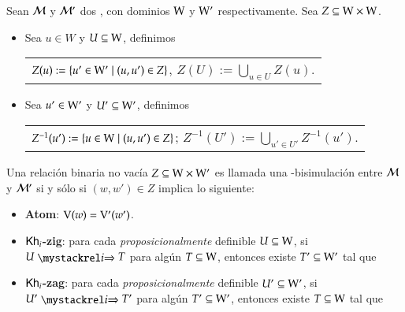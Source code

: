 \begin{definicion}\label{def:bisimulation}
    Sean $\mathcal{M}$ y $\mathcal{M}'$ dos \ultss, con dominios $\mathrm{W}$ y $\mathrm{W}'$ respectivamente. Sea $Z \subseteq \mathrm{W} \times \mathrm{W}$.
    \begin{itemize}
        \item Sea $u \in W$ y $U \subseteq \mathrm{W}$, definimos
        \begin{nscenter}
            \begin{tabular}{@{}c@{}}
                $Z(u) := \{ u' \in \mathrm{W}' \mid (u,u') \in Z \}$, \qquad $Z(U) := \bigcup_{u \in U} Z(u)$.
            \end{tabular}
        \end{nscenter}
        \item Sea $u' \in \mathrm{W}'$ y $U' \subseteq \mathrm{W}'$, definimos
        \begin{nscenter}
            \begin{tabular}{@{}c@{}}
                $Z^{-1}(u') := \{ u \in \mathrm{W} \mid (u,u') \in Z \}$; \qquad $Z^{-1}(U') := \bigcup_{u' \in U'} Z^{-1}(u')$.
            \end{tabular}
        \end{nscenter}
    \end{itemize}

    Una relación binaria no vacía $Z \subseteq \mathrm{W} \times \mathrm{W}'$ es llamada una \KHilogic-bisimulación entre $\mathcal{M}$ y 
    $\mathcal{M}'$ si y sólo si $(w,w') \in Z$ implica lo siguiente:
    \begin{itemize}
        \item \textbf{Atom}: $\mathrm{V}(w)=\mathrm{V}'(w')$.

        \item \textbf{$\mathsf{Kh}_i$-zig}: para cada \emph{proposicionalmente} definible $U \subseteq \mathrm{W}$, si $U \ultsExecAgi T$ para algún $T \subseteq \mathrm{W}$, entonces existe $T' \subseteq \mathrm{W}'$ tal que
        \begin{multicols}{2}
        \end{multicols}
        
        \item \textbf{$\mathsf{Kh}_i$-zag}: para cada \emph{proposicionalmente} definible $U' \subseteq \mathrm{W}'$, si $U' \ultsExecAgi T'$ para algún $T' \subseteq \mathrm{W}'$, entonces existe $T \subseteq \mathrm{W}$ tal que
        \begin{multicols}{2}
        \end{multicols}


\end{itemize}
\end{definicion}
